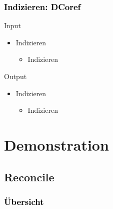\documentclass[xcolor=dvipsnames]{beamer}
\begin{document}

\begin{frame}\frametitle{\textcolor{black}{Indizieren: DCoref}}

\begin{block}{Input}
\begin{itemize}
\item Indizieren
\begin{itemize}
\item Indizieren
\end{itemize}
\end{itemize}
\end{block}

\begin{block}{Output}
\begin{itemize}
\item Indizieren
\begin{itemize}
\item Indizieren
\end{itemize}
\end{itemize}
\end{block}

\end{frame}


\section{Demonstration}


\subsection{Reconcile}


\begin{frame}[plain]\frametitle{\textcolor{black}{Übersicht}}


\end{frame}

\addtocounter{framenumber}{-1}

\end{document}
